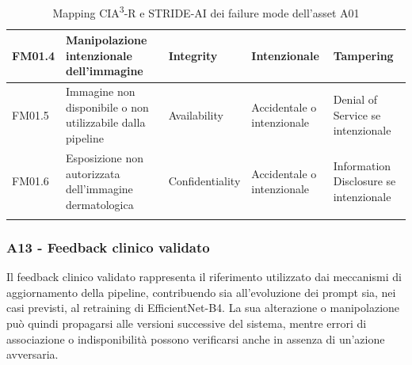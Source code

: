 {\begin{xltabular}{\textwidth}{
    >{\raggedright\arraybackslash}p{1.35cm}
    X
    >{\raggedright\arraybackslash}p{3.5cm}
    >{\raggedright\arraybackslash}p{2.7cm}
    >{\raggedright\arraybackslash}p{2.4cm}
}
\midrule


FM01.4 &

Manipolazione intenzionale dell'immagine &

Integrity &

Intenzionale &

Tampering \\

\midrule


FM01.5 &

Immagine non disponibile o non utilizzabile dalla pipeline &

Availability &

Accidentale o intenzionale &

Denial of Service se intenzionale \\

\midrule


FM01.6 &

Esposizione non autorizzata dell'immagine dermatologica &

Confidentiality &

Accidentale o intenzionale &

Information Disclosure se intenzionale \\

\bottomrule

\caption{Mapping CIA\textsuperscript{3}-R e STRIDE-AI dei failure mode dell'asset A01}
\label{tab:a01-stride}

\end{xltabular}
}


\subsubsection{A13 - Feedback clinico validato}
Il feedback clinico validato rappresenta il riferimento utilizzato dai meccanismi di aggiornamento della pipeline, contribuendo sia all'evoluzione dei prompt sia, nei casi previsti, al retraining di EfficientNet-B4. La sua alterazione o manipolazione può quindi propagarsi alle versioni successive del sistema, mentre errori di associazione o indisponibilità possono verificarsi anche in assenza di un'azione avversaria.

